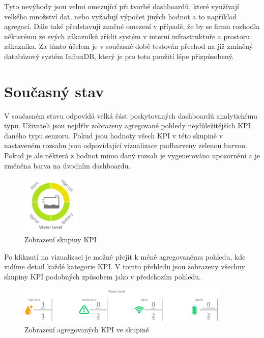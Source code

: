 Tyto nevýhody jsou velmi omezující při tvorbě dashboardů, které využívají velkého množství dat, nebo vyžadují výpočet jiných hodnot a to například agregací. Dále také představují značné omezení v případě, že by se firma rozhodla některému ze svých zákazníků zřídit systém v interní infrastruktuře a prostoru zákazníka. Za tímto účelem je v současné době testován přechod na již zmíněný databázový systém InfluxDB, který je pro toto použití lépe přizpůsobený.

\section{Současný stav}
V současném stavu odpovídá velká část poskytovaných dashboardů analytickému typu. Uživateli jsou nejdřív zobrazeny agregované pohledy nejdůležitějších KPI daného typu senzoru. Pokud jsou hodnoty všech KPI v této skupině v nastaveném rozsahu jsou odpovídající vizualizace podbarveny zelenou barvou. Pokud je ale některá z hodnot mimo daný rozsah je vygenerováno upozornění a je změněna barva na úvodním dashboardu.

\begin{figure}[H]
\label{question4}
\begin{center}
    \includegraphics[width=0.25\textwidth]{obrazky-figures/l1.png}
\end{center}
\caption{Zobrazení skupiny KPI}
\end{figure}

Po kliknutí na vizualizaci je možné přejít k méně agregovanému pohledu, kde vidíme detail každé kategorie KPI. V tomto přehledu jsou zobrazeny všechny skupiny KPI podobných způsobem jako v předchozím pohledu. 

\begin{figure}[H]
\label{question4}
\begin{center}
    \includegraphics[width=0.9\textwidth]{obrazky-figures/l2.png}
\end{center}
\caption{Zobrazení agregovaných KPI ve skupině}
\end{figure}

